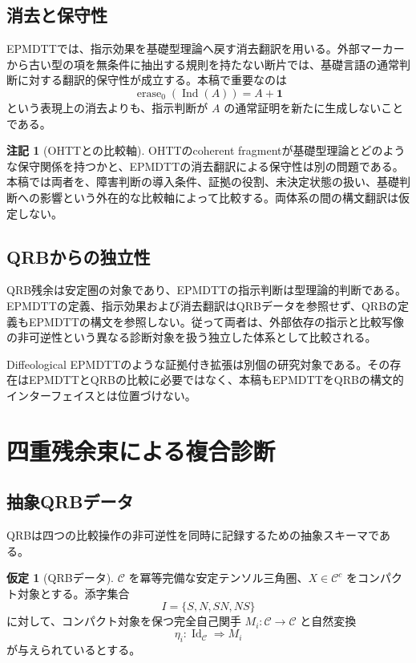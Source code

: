 \documentclass[a4paper,11pt]{ltjsarticle}
\theoremstyle{definition}
\newtheorem{assumption}[definition]{仮定}
\newtheorem{remark}[definition]{注記}
\theoremstyle{plain}
\newcommand{\Ind}{\operatorname{Ind}}
\newcommand{\Unit}{\mathbf 1}
\newcommand{\Id}{\operatorname{Id}}
\newcommand{\erase}{\operatorname{erase}}
\begin{document}
\subsection{消去と保守性}

EPMDTTでは、指示効果を基礎型理論へ戻す消去翻訳を用いる。外部マーカーから古い型の項を無条件に抽出する規則を持たない断片では、基礎言語の通常判断に対する翻訳的保守性が成立する\cite{ChibaEPMDTT2026}。本稿で重要なのは
\begin{equation}
 \erase_0(\Ind(A))=A+\Unit
\end{equation}
という表現上の消去よりも、指示判断が $A$ の通常証明を新たに生成しないことである。

\begin{remark}[OHTTとの比較軸]
OHTTのcoherent fragmentが基礎型理論とどのような保守関係を持つかと、EPMDTTの消去翻訳による保守性は別の問題である。本稿では両者を、障害判断の導入条件、証拠の役割、未決定状態の扱い、基礎判断への影響という外在的な比較軸によって比較する。両体系の間の構文翻訳は仮定しない。
\end{remark}

\subsection{QRBからの独立性}

QRB残余は安定圏の対象であり、EPMDTTの指示判断は型理論的判断である。EPMDTTの定義、指示効果および消去翻訳はQRBデータを参照せず、QRBの定義もEPMDTTの構文を参照しない。従って両者は、外部依存の指示と比較写像の非可逆性という異なる診断対象を扱う独立した体系として比較される。

Diffeological EPMDTTのような証拠付き拡張は別個の研究対象である\cite{ChibaDEPMDTT2026}。その存在はEPMDTTとQRBの比較に必要ではなく、本稿もEPMDTTをQRBの構文的インターフェイスとは位置づけない。

\section{四重残余束による複合診断}

\subsection{抽象QRBデータ}

QRBは四つの比較操作の非可逆性を同時に記録するための抽象スキーマである\cite{ChibaQRB2026}。

\begin{assumption}[QRBデータ]
$\mathcal C$ を冪等完備な安定テンソル三角圏、$X\in\mathcal C^c$ をコンパクト対象とする。添字集合
\begin{equation}
 I=\{S,N,SN,NS\}
\end{equation}
に対して、コンパクト対象を保つ完全自己関手 $M_i:\mathcal C\to\mathcal C$ と自然変換
\begin{equation}
 \eta_i:\Id_{\mathcal C}\Rightarrow M_i
\end{equation}
が与えられているとする。
\end{assumption}
\end{document}
